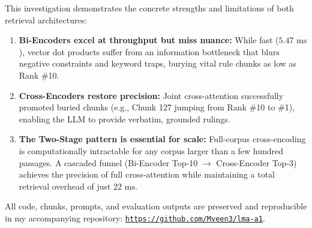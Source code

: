 \documentclass[11pt,a4paper]{article}
\begin{document}
This investigation demonstrates the concrete strengths and limitations of both retrieval architectures:
\begin{enumerate}[itemsep=1.5pt,topsep=1.5pt]
    \item \textbf{Bi-Encoders excel at throughput but miss nuance:} While fast ($5.47\text{ ms}$), vector dot products suffer from an information bottleneck that blurs negative constraints and keyword traps, burying vital rule chunks as low as Rank \#10.
    \item \textbf{Cross-Encoders restore precision:} Joint cross-attention successfully promoted buried chunks (e.g., Chunk 127 jumping from Rank \#10 to \#1), enabling the LLM to provide verbatim, grounded rulings.
    \item \textbf{The Two-Stage pattern is essential for scale:} Full-corpus cross-encoding is computationally intractable for any corpus larger than a few hundred passages. A cascaded funnel (Bi-Encoder Top-10 $\to$ Cross-Encoder Top-3) achieves the precision of full cross-attention while maintaining a total retrieval overhead of just $22\text{ ms}$.
\end{enumerate}

All code, chunks, prompts, and evaluation outputs are preserved and reproducible in my accompanying repository: \href{https://github.com/Mveen3/lma-a1}{\texttt{https://github.com/Mveen3/lma-a1}}.
\end{document}
